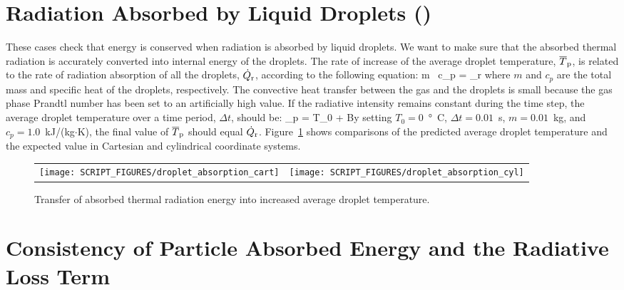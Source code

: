 \documentclass[11pt]{book}
\begin{document}
\section{Radiation Absorbed by Liquid Droplets (\texorpdfstring{}{droplet\_absorption}) }
\label{droplet_absorption}
\label{droplet_absorption_cart}
\label{droplet_absorption_cyl}

These cases check that energy is conserved when radiation is absorbed by liquid droplets. We want to make sure that the absorbed thermal radiation is accurately converted into internal energy of the droplets. The rate of increase of the average droplet temperature, $\overline{T}_{\rm p}$, is related to the rate of radiation absorption of all the droplets, $\dot{Q}_{\rm r}$, according to the following equation:
\be
m \, c_p  = _{\rm r}
\ee
where $m$ and $c_p$ are the total mass and specific heat of the droplets, respectively. The convective heat transfer between the gas and the droplets is small because the gas phase Prandtl number has been set to an artificially high value. If the radiative intensity remains constant during the time step, the average droplet temperature over a time period, $\Delta t$, should be:
\be
{}_{\rm p} = T_0 + 
\ee
By setting $T_0=0$~\si{\degree C}, $\Delta t =0.01$~s, $m =0.01$~kg, and $c_p =1.0$~kJ/(kg$\cdot$K), the final value of $\overline{T}_{\rm p}$ should equal $\dot{Q}_{\rm r}$. Figure~\ref{droplet_absorption_figures} shows comparisons of the predicted average droplet temperature and the expected value in Cartesian and cylindrical coordinate systems.

\begin{figure}[ht]
\noindent
\begin{tabular*}{\textwidth}{l@{\extracolsep{\fill}}r}
\texttt{[image: SCRIPT\_FIGURES/droplet\_absorption\_cart]} &
\texttt{[image: SCRIPT\_FIGURES/droplet\_absorption\_cyl]}
\end{tabular*}
\caption[Radiation absorption by liquid droplets]{Transfer of absorbed thermal radiation energy into increased average droplet temperature.}
\label{droplet_absorption_figures}
\end{figure}


\section{Consistency of Particle Absorbed Energy and the Radiative Loss Term}
\label{particle_isotropic_radi}
\label{particle_anisotropic_radi}
\end{document}
